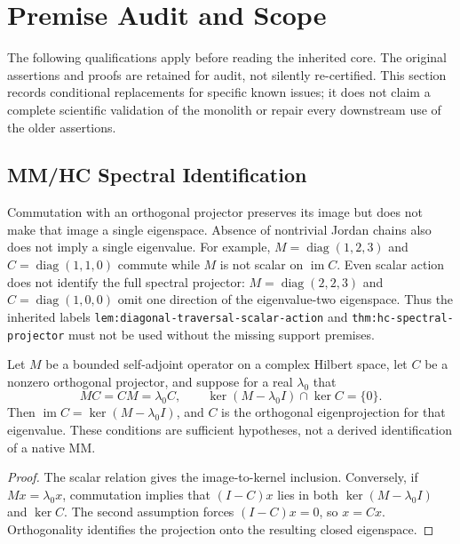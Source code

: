 \section{Premise Audit and Scope}
\label{v480:premise-audit}

The following qualifications apply before reading the inherited core.
The original assertions and proofs are retained for audit, not silently
re-certified. This section records conditional replacements for specific
known issues; it does not claim a complete scientific validation of the
monolith or repair every downstream use of the older assertions.

\subsection{MM/HC Spectral Identification}
\label{v480:spectral-premises}

Commutation with an orthogonal projector preserves its image but does
not make that image a single eigenspace. Absence of nontrivial Jordan
chains also does not imply a single eigenvalue. For example,
$M=\operatorname{diag}(1,2,3)$ and $C=\operatorname{diag}(1,1,0)$
commute while $M$ is not scalar on $\operatorname{im}C$.
Even scalar action does not identify the full spectral projector:
$M=\operatorname{diag}(2,2,3)$ and $C=\operatorname{diag}(1,0,0)$
omit one direction of the eigenvalue-two eigenspace.
Thus the inherited labels
\texttt{lem:diagonal-traversal-scalar-action} and
\texttt{thm:hc-spectral-projector} must not be used without the
missing support premises.

\begin{proposition}
\label{v480:conditional-mm}
Let $M$ be a bounded self-adjoint operator on a complex Hilbert space,
let $C$ be a nonzero orthogonal projector, and suppose for a real
$\lambda_0$ that
\[
 MC=CM=\lambda_0 C,
 \qquad \ker(M-\lambda_0 I)\cap\ker C=\{0\}.
\]
Then $\operatorname{im}C=\ker(M-\lambda_0 I)$, and $C$ is the
orthogonal eigenprojection for that eigenvalue. These conditions
are sufficient hypotheses, not a derived identification of a native MM.
\end{proposition}
\begin{proof}
The scalar relation gives the image-to-kernel inclusion. Conversely,
if $Mx=\lambda_0x$, commutation implies that $(I-C)x$ lies in both
$\ker(M-\lambda_0I)$ and $\ker C$. The second assumption forces
$(I-C)x=0$, so $x=Cx$. Orthogonality identifies the projection onto
the resulting closed eigenspace.
\end{proof}

